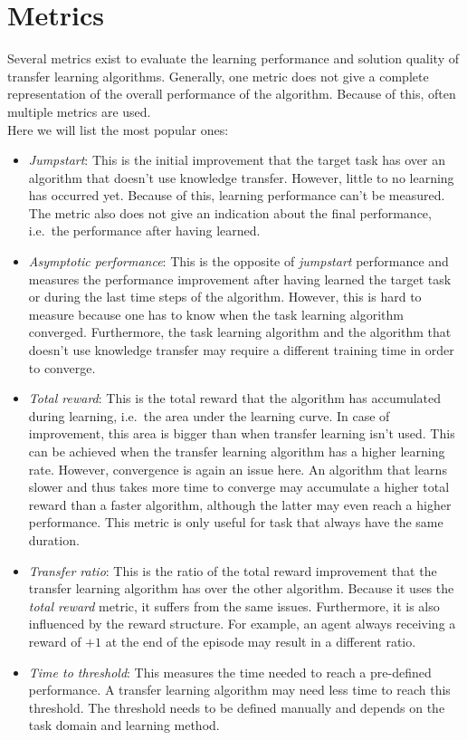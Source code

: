 \section{Metrics}
\label{sub:tl_metrics}
Several metrics exist to evaluate the learning performance and solution quality of transfer learning algorithms. Generally, one metric does not give a complete representation of the overall performance of the algorithm. Because of this, often multiple metrics are used.\\
Here we will list the most popular ones:
\begin{itemize}
    \item \textit{Jumpstart}: This is the initial improvement that the target task has over an algorithm that doesn't use knowledge transfer. However, little to no learning has occurred yet. Because of this, learning performance can't be measured. The metric also does not give an indication about the final performance, i.e.\ the performance after having learned.
    \item \textit{Asymptotic performance}: This is the opposite of \textit{jumpstart} performance and measures the performance improvement after having learned the target task or during the last time steps of the algorithm. However, this is hard to measure because one has to know when the task learning algorithm converged. Furthermore, the task learning algorithm and the algorithm that doesn't use knowledge transfer may require a different training time in order to converge.
    \item \textit{Total reward}: This is the total reward that the algorithm has accumulated during learning, i.e.\ the area under the learning curve. In case of improvement, this area is bigger than when transfer learning isn't used. This can be achieved when the transfer learning algorithm has a higher learning rate.
    However, convergence is again an issue here. An algorithm that learns slower and thus takes more time to converge may accumulate a higher total reward than a faster algorithm, although the latter may even reach a higher performance. This metric is only useful for task that always have the same duration.
    \item \textit{Transfer ratio}: This is the ratio of the total reward improvement that the transfer learning algorithm has over the other algorithm. Because it uses the \textit{total reward} metric, it suffers from the same issues. Furthermore, it is also influenced by the reward structure. For example, an agent always receiving a reward of $+1$ at the end of the episode may result in a different ratio.
    \item \textit{Time to threshold}: This measures the time needed to reach a pre-defined performance. A transfer learning algorithm may need less time to reach this threshold. The threshold needs to be defined manually and depends on the task domain and learning method.
\end{itemize}
